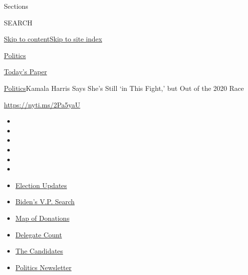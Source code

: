 Sections

SEARCH

\protect\hyperlink{site-content}{Skip to
content}\protect\hyperlink{site-index}{Skip to site index}

\href{https://www.nytimes.com/section/politics}{Politics}

\href{https://myaccount.nytimes.com/auth/login?response_type=cookie\&client_id=vi}{}

\href{https://www.nytimes.com/section/todayspaper}{Today's Paper}

\href{/section/politics}{Politics}\textbar{}Kamala Harris Says She's
Still `in This Fight,' but Out of the 2020 Race

\url{https://nyti.ms/2Pa5yaU}

\begin{itemize}
\item
\item
\item
\item
\item
\item
\end{itemize}

\begin{itemize}
\item
  \href{https://www.nytimes.com/2020/07/31/us/elections/biden-vs-trump.html?action=click\&pgtype=Article\&state=default\&region=TOP_BANNER\&context=storylines_menu}{Election
  Updates}
\item
  \href{https://www.nytimes.com/article/biden-vice-president-2020.html?action=click\&pgtype=Article\&state=default\&region=TOP_BANNER\&context=storylines_menu}{Biden's
  V.P. Search}
\item
  \href{https://www.nytimes.com/interactive/2020/07/24/us/politics/trump-biden-campaign-donors.html?action=click\&pgtype=Article\&state=default\&region=TOP_BANNER\&context=storylines_menu}{Map
  of Donations}
\item
  \href{https://www.nytimes.com/interactive/2020/us/elections/delegate-count-primary-results.html?action=click\&pgtype=Article\&state=default\&region=TOP_BANNER\&context=storylines_menu}{Delegate
  Count}
\item
  \href{https://www.nytimes.com/interactive/2019/us/politics/2020-presidential-candidates.html?action=click\&pgtype=Article\&state=default\&region=TOP_BANNER\&context=storylines_menu}{The
  Candidates}
\item
  \href{https://www.nytimes.com/newsletters/politics?action=click\&pgtype=Article\&state=default\&region=TOP_BANNER\&context=storylines_menu}{Politics
  Newsletter}
\end{itemize}


